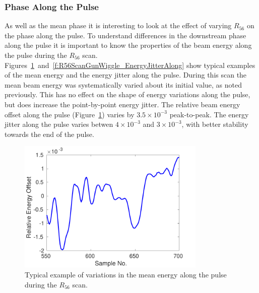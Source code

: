 \subsubsection{Phase Along the Pulse}

As well as the mean phase it is interesting to look at the effect of varying \(R_{56}\) on the phase along the pulse. To understand differences in the downstream phase along the pulse it is important to know the properties of the beam energy along the pulse during the \(R_{56}\) scan. Figures~\ref{f:R56ScanGunWiggle_MeanEnergyAlong}~and~\ref{f:R56ScanGunWiggle_EnergyJitterAlong} show typical examples of the mean energy and the energy jitter along the pulse. During this scan the mean beam energy was systematically varied about its initial value, as noted previously. This has no effect on the shape of energy variations along the pulse, but does increase the point-by-point energy jitter. The relative beam energy offset along the pulse (Figure~\ref{f:R56ScanGunWiggle_MeanEnergyAlong}) varies by \(3.5\times10^{-3}\) peak-to-peak. The energy jitter along the pulse varies betwen \(4\times10^{-3}\) and \(3\times10^{-3}\), with better stability towards the end of the pulse.

\begin{figure}
  \centering
  \includegraphics[width=0.8\textwidth]{Figures/propagation/R56ScanGunWiggle_MeanEnergyAlong}
  \caption{Typical example of variations in the mean energy along the pulse during the \(R_{56}\) scan.}
  \label{f:R56ScanGunWiggle_MeanEnergyAlong}
\end{figure}

